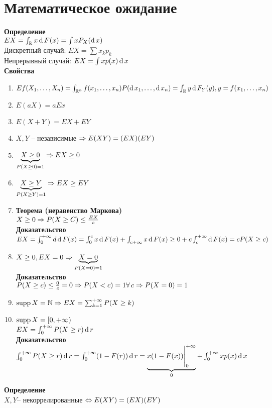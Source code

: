 \documentclass[12pt]{article}
\begin{document}
\section{Математическое ожидание}
\textbf{Определение}\\
$EX = \int_\Rset x \df F(x) = \int x P_X(\df x)$\\
Дискретный случай: $EX = \sum x_k p_k$\\
Непрерывный случай: $EX = \int xp(x)\df x$\\
\textbf{Свойства}
\begin{enumerate}
    \item $Ef(X_1, \ldots, X_n) = \int_{\Rset^n} f(x_1, \ldots, x_n) P(\df x_1, \ldots, \df x_n) = \int_\Rset y \df F_Y(y), y = f(x_1, \ldots, x_n)$
    \item $E(aX) = aEx$
    \item $E(X+Y) = EX+EY$
    \item $X, Y$ -- независимые $\Rto E(XY) = (EX)(EY)$
    \item $\ub{P(X \geq 0) = 1}{X \geq 0} \Rto EX \geq 0$
    \item $\ub{P(X\geq Y) = 1}{X \geq Y} \Rto EX \geq EY$
    \item 
    \textbf{Теорема (неравенство Маркова)}\\
    $X \geq 0 \Rto P(X \geq C) \leq \frac{EX}{c}$\\
    \textbf{Доказательство}\\
    $EX = \int_0^{+\infty} d\df F(x) = \int_0^c x\df F(x) + \int_{c+\infty} x\df F(x) \geq 0 + c\int_c^{+\infty} \df F(x) = cP(X \geq c)$
    \item $X \geq 0, EX = 0 \Rto \ub{P(X = 0) = 1}{X=0}$\\
    \textbf{Доказательство}\\
    $P(X \geq c) \leq \frac0c = 0 \Rto P(X < c) = 1 \fall c \Rto P(X = 0) = 1$
    \item $\supp X = \Nset \Rto EX = \sum_{k=1}^{+\infty} P(X \geq k)$
    \item $\supp X = [0, +\infty)$\\
    $EX = \int_0^{+\infty} P(X \geq r) \df r$\\
    \textbf{Доказательство}\\
    $\int_0^{+\infty} P(X \geq r) \df r = \int_0^{+\infty} (1-F(r))\df r = \ub{0}{x(1-F(x))\vl_0^{+\infty}} + \int_0^{+\infty} x p(x)\df x$
\end{enumerate}
\textbf{Определение}\\
$X, Y$-- некоррелированные $\LRto E(XY)=(EX)(EY)$\\
\end{document}
